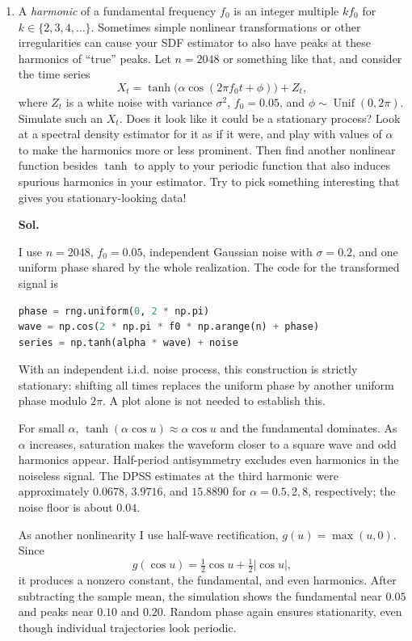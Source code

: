 \documentclass[lang=en,11pt,a4paper,citestyle =authoryear,nobib=true]{elegantpaper}
\begin{document}
\begin{enumerate}[label=\arabic*.,leftmargin=*]
\item A \emph{harmonic} of a fundamental frequency $f_0$ is an integer multiple $kf_0$ for $k\in\{2,3,4,\ldots\}$. Sometimes simple nonlinear transformations or other irregularities can cause your SDF estimator to also have peaks at these harmonics of ``true'' peaks. Let $n=2048$ or something like that, and consider the time series
\[
X_t=\tanh\bigl(\alpha\cos(2\pi f_0t+\phi)\bigr)+Z_t,
\]
where $Z_t$ is a white noise with variance $\sigma^2$, $f_0=0.05$, and $\phi\sim\operatorname{Unif}(0,2\pi)$. Simulate such an $X_t$. Does it look like it could be a stationary process? Look at a spectral density estimator for it as if it were, and play with values of $\alpha$ to make the harmonics more or less prominent. Then find another nonlinear function besides $\tanh$ to apply to your periodic function that also induces spurious harmonics in your estimator. Try to pick something interesting that gives you stationary-looking data!
\par\vspace{0.5em}\textbf{Sol.}\par

I use $n=2048$, $f_0=0.05$, independent Gaussian noise with
$\sigma=0.2$, and one uniform phase shared by the whole realization.
The code for the transformed signal is
\begin{lstlisting}[language=Python]
phase = rng.uniform(0, 2 * np.pi)
wave = np.cos(2 * np.pi * f0 * np.arange(n) + phase)
series = np.tanh(alpha * wave) + noise
\end{lstlisting}
With an independent i.i.d. noise process, this construction is strictly
stationary: shifting all times replaces the uniform phase by another
uniform phase modulo $2\pi$. A plot alone is not needed to establish this.

For small $\alpha$, $\tanh(\alpha\cos u)\approx\alpha\cos u$ and the
fundamental dominates. As $\alpha$ increases, saturation makes the waveform
closer to a square wave and odd harmonics appear. Half-period antisymmetry
excludes even harmonics in the noiseless signal. The DPSS estimates at the
third harmonic were approximately $0.0678$, $3.9716$, and $15.8890$ for
$\alpha=0.5,2,8$, respectively; the noise floor is about $0.04$.

As another nonlinearity I use half-wave rectification,
$g(u)=\max(u,0)$. Since
\[
g(\cos u)=\tfrac12\cos u+\tfrac12|\cos u|,
\]
it produces a nonzero constant, the fundamental, and even harmonics.
After subtracting the sample mean, the simulation shows the fundamental
near $0.05$ and peaks near $0.10$ and $0.20$. Random phase again ensures
stationarity, even though individual trajectories look periodic.


\end{enumerate}
\end{document}

